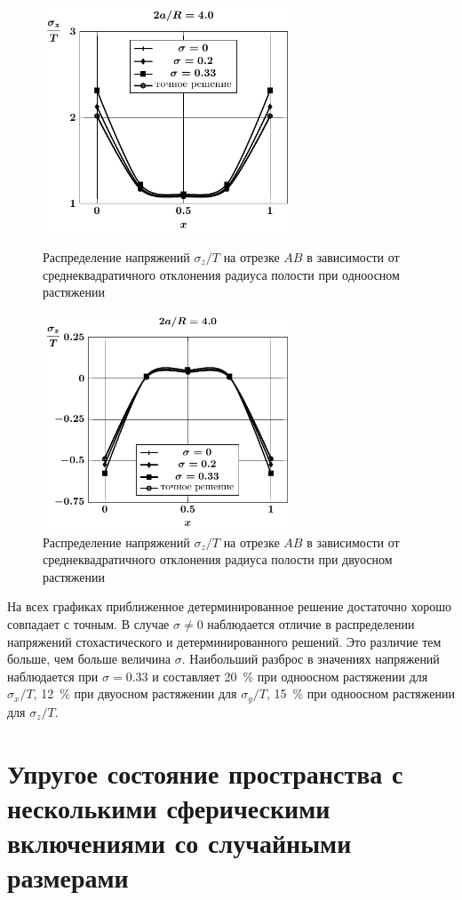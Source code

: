 \begin{figure}[h!]
\centering\footnotesize
\parbox[b]{7.5cm}{\centering\includegraphics[width=7.3cm]{spheres-cav8-t1-sig_z-stoch.pdf}
\caption{Распределение напряжений $\sigma_z/T$ на отрезке $AB$ в зависимости от среднеквадратичного отклонения радиуса полости при одноосном растяжении 
\label{f:13:6}}}\hfil\hfil
\parbox[b]{7.5cm}{\centering\includegraphics[width=7.3cm]{spheres-cav8-t2-sig_z-stoch.pdf}
\caption{Распределение напряжений $\sigma_z/T$ на отрезке $AB$ в зависимости от среднеквадратичного отклонения радиуса полости при двуосном растяжении
\label{f:13:7}}}
\end{figure}

На всех графиках приближенное детерминированное решение достаточно хорошо совпадает с точным. В случае $\sigma\neq 0$ наблюдается отличие в распределении напряжений стохастического и детерминированного решений. Это различие тем больше, чем больше величина $\sigma$. Наибольший разброс в значениях напряжений наблюдается при $\sigma=0.33$ и составляет 20~\% при одноосном растяжении для $\sigma_x/T$, 12~\% при двуосном растяжении для $\sigma_y/T$, 15~\% при одноосном растяжении для $\sigma_z/T$.

\section{Упругое состояние пространства с несколькими сферическими включениями со случайными размерами}


